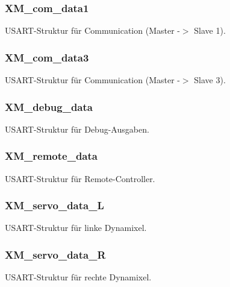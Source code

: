 \subsubsection[{XM\_\-com\_\-data1}]{ {\bf XM\_\-com\_\-data1}}\label{xmega_8h_a4672c4ccb395460c4b53a1ed26be4b0d}
USART-\/Struktur für Communication (Master -\/$>$ Slave 1). 
\subsubsection[{XM\_\-com\_\-data3}]{ {\bf XM\_\-com\_\-data3}}\label{xmega_8h_a07895d723423d93062b1702c7b2e8bcb}
USART-\/Struktur für Communication (Master -\/$>$ Slave 3). 
\subsubsection[{XM\_\-debug\_\-data}]{ {\bf XM\_\-debug\_\-data}}\label{xmega_8h_a9c7eb4b6e67fb70bbd979a051bed0dbf}
USART-\/Struktur für Debug-\/Ausgaben. 
\subsubsection[{XM\_\-remote\_\-data}]{ {\bf XM\_\-remote\_\-data}}\label{xmega_8h_abe1dc522d344bba084424b3e22ff50e0}
USART-\/Struktur für Remote-\/Controller. 
\subsubsection[{XM\_\-servo\_\-data\_\-L}]{ {\bf XM\_\-servo\_\-data\_\-L}}\label{xmega_8h_a448f43e4abff317a9da514b54be01296}
USART-\/Struktur für linke Dynamixel. 
\subsubsection[{XM\_\-servo\_\-data\_\-R}]{ {\bf XM\_\-servo\_\-data\_\-R}}\label{xmega_8h_ac1fe899fc4d2597e76c41c8def9ba066}
USART-\/Struktur für rechte Dynamixel. 